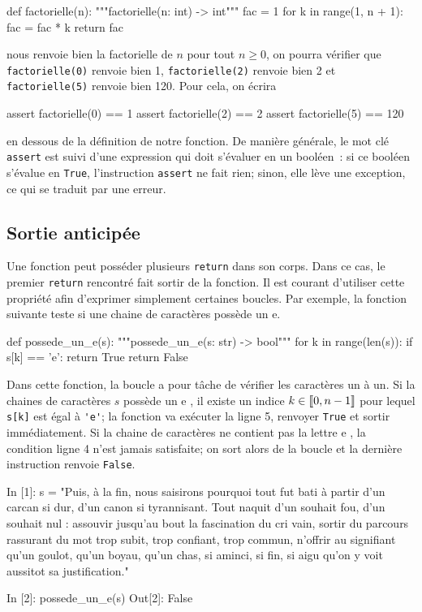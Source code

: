 \documentclass{magnolia}
\begin{document}
\begin{pythoncodeline}
def factorielle(n):
    """factorielle(n: int) -> int"""
    fac = 1
    for k in range(1, n + 1):
        fac = fac * k
    return fac
\end{pythoncodeline}
\noindent nous renvoie bien la factorielle de $n$ pour tout $n\geq 0$,
on pourra vérifier que \verb!factorielle(0)! renvoie bien 1, \verb!factorielle(2)! renvoie bien 2 et
\verb!factorielle(5)! renvoie bien 120. Pour cela, on écrira

\begin{pythoncodeline}
assert factorielle(0) == 1
assert factorielle(2) == 2
assert factorielle(5) == 120
\end{pythoncodeline}
en dessous de la définition de notre fonction. De manière générale, le mot clé \verb!assert! est suivi d'une
expression qui doit s'évaluer en un booléen~: si ce booléen s'évalue en \verb!True!, l'instruction
\verb!assert! ne fait rien; sinon, elle lève une exception, ce qui se traduit par une erreur.

\subsection{Sortie anticipée}

Une fonction peut posséder plusieurs \verb_return_ dans son corps. Dans ce cas, le
premier \verb_return_ rencontré fait sortir de la fonction. Il est courant d'utiliser
cette propriété afin d'exprimer simplement certaines boucles. Par exemple, la fonction
suivante teste si une chaine de caractères possède un e.

\begin{pythoncodeline}
def possede_un_e(s):
    """possede_un_e(s: str) -> bool"""
    for k in range(len(s)):
        if s[k] == 'e':
            return True
    return False
\end{pythoncodeline}

\noindent
Dans cette fonction, la boucle a pour tâche de vérifier les caractères un à un. Si la
chaines de caractères $s$ possède un \og e \fg, il existe un indice $k\in\left\llbracket 0,n-1\right\rrbracket$
pour lequel \verb_s[k]_ est égal à \verb_'e'_; la fonction va exécuter la ligne 5,
renvoyer \verb_True_ et sortir immédiatement. Si la chaine de caractères
ne contient pas la lettre \og e \fg, la condition ligne 4 n'est jamais
satisfaite; on sort alors de la boucle et la dernière instruction renvoie \verb_False_.

\begin{pythoncode}
In [1]: s = "Puis, à la fin, nous saisirons pourquoi tout fut bati à partir d'un carcan si dur, d'un canon si tyrannisant. Tout naquit d'un souhait fou, d'un souhait nul : assouvir jusqu'au bout la fascination du cri vain, sortir du parcours rassurant du mot trop subit, trop confiant, trop commun, n'offrir au signifiant qu'un goulot, qu'un boyau, qu'un chas, si aminci, si fin, si aigu qu'on y voit aussitot sa justification."

In [2]: possede_un_e(s)
Out[2]: False
\end{pythoncode}
\end{document}
